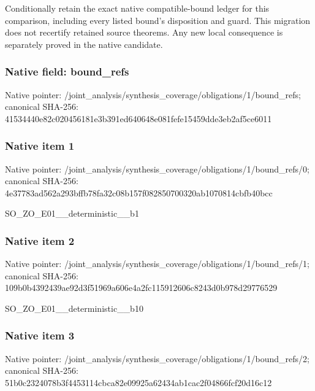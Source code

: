 \documentclass[10pt,a4paper]{article}
\begin{document}
\begingroup\raggedright\sloppy Conditionally retain the exact native compatible-bound ledger for this comparison,\allowbreak{} including every listed bound's disposition and guard. This migration does not recertify retained source theorems. Any new local consequence is separately proved in the native candidate.\par\endgroup

\subsubsection{Native field: bound\_\allowbreak{}refs}
Native pointer: /joint\_\allowbreak{}analysis/synthesis\_\allowbreak{}coverage/obligations/1/bound\_\allowbreak{}refs; canonical SHA-256: 41534440e82c020456181e3b391ed640648e081fefe15459dde3eb2af5ce6011

\subsubsection{Native item 1}
Native pointer: /joint\_\allowbreak{}analysis/synthesis\_\allowbreak{}coverage/obligations/1/bound\_\allowbreak{}refs/0; canonical SHA-256: 4e37783ad562a293bffb78fa32c08b157f082850700320ab1070814cbfb40bcc

\begingroup\raggedright\sloppy SO\_\allowbreak{}ZO\_\allowbreak{}E01\_\allowbreak{}\_\allowbreak{}deterministic\_\allowbreak{}\_\allowbreak{}b1\par\endgroup

\subsubsection{Native item 2}
Native pointer: /joint\_\allowbreak{}analysis/synthesis\_\allowbreak{}coverage/obligations/1/bound\_\allowbreak{}refs/1; canonical SHA-256: 109b0b4392439ae92d3f51969a606e4a2fc115912606c8243d0b978d29776529

\begingroup\raggedright\sloppy SO\_\allowbreak{}ZO\_\allowbreak{}E01\_\allowbreak{}\_\allowbreak{}deterministic\_\allowbreak{}\_\allowbreak{}b10\par\endgroup

\subsubsection{Native item 3}
Native pointer: /joint\_\allowbreak{}analysis/synthesis\_\allowbreak{}coverage/obligations/1/bound\_\allowbreak{}refs/2; canonical SHA-256: 51b0c2324078b3f4453114cbca82e09925a62434ab1cac2f04866fcf20d16c12
\end{document}
